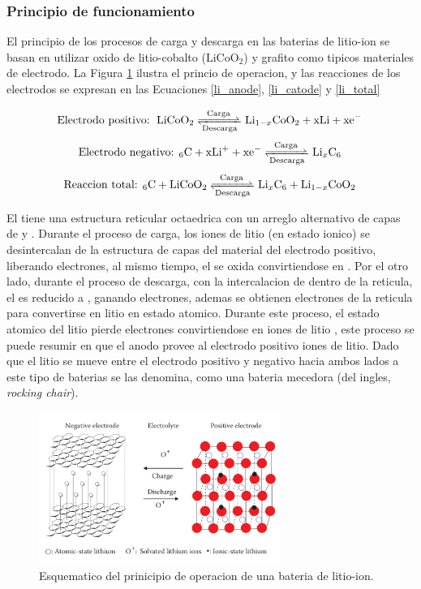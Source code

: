 \documentclass[10pt,a4paper]{article}
\newcommand\reaction[1]{\begin{equation}\ce{#1}\end{equation}}
\begin{document}
    \subsubsection{Principio de funcionamiento}

    El principio de los procesos de carga y descarga en las baterias de
    litio-ion se basan en utilizar oxido de litio-cobalto ($\mathrm{LiCoO_2}$)
    y grafito como tipicos materiales de electrodo. La Figura
    \ref{op_lithium-ion} ilustra el princio de operacion, y las reacciones de
    los electrodos se expresan en  las Ecuaciones \ref{li_anode}, 
    \ref{li_catode} y \ref{li_total}

    \reaction{\text{Electrodo positivo: } LiCoO2 <=>[Carga][Descarga] Li_{1-x}CoO2 + xLi + xe^- \label{li_anode}}
    \reaction{\text{Electrodo negativo: }6C + xLi^+ + xe^- <=>[Carga][Descarga] Li_{x}C6 \label{li_catode}}
    \reaction{\text{Reaccion total: }6C + LiCoO2 <=>[Carga][Descarga] Li_{x}C6 + Li_{1-x}CoO2 \label{li_total}}

    \noindent El  tiene una estructura reticular octaedrica con un arreglo
    alternativo de capas de  y . Durante el proceso de
    carga, los iones de litio (en estado ionico) se desintercalan de la
    estructura de capas del material del electrodo positivo, liberando electrones, 
    al mismo tiempo, el  se oxida convirtiendose en .
    Por el otro lado, durante el proceso de descarga, con la intercalacion de  dentro de 
    la reticula, el  es reducido a , ganando 
    electrones, ademas se obtienen electrones de la reticula para 
    convertirse en litio en estado atomico. Durante este proceso, el estado 
    atomico del litio pierde electrones convirtiendose en iones de litio 
    , este proceso se puede resumir en que el anodo provee al electrodo positivo 
    iones de litio. Dado que el litio se mueve entre el electrodo positivo y 
    negativo hacia ambos lados a este tipo de baterias se las denomina, como 
    una bateria mecedora (del ingles, \emph{rocking chair}).


    \begin{figure}[h!]
        \begin{center}
            \includegraphics[width=0.7\textwidth]{prin_litio}
            \caption{Esquematico del prinicipio de operacion de una bateria de
            litio-ion.}
            \label{op_lithium-ion}
        \end{center}
    \end{figure}
\end{document}
